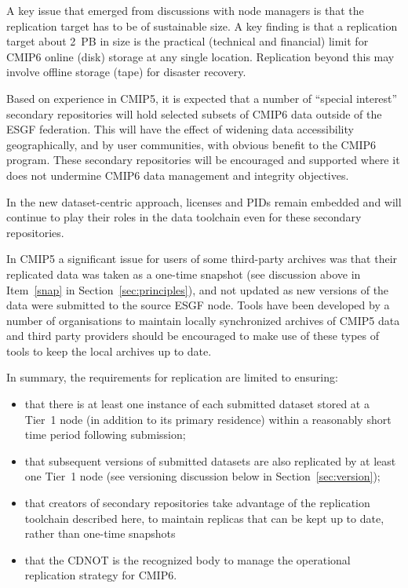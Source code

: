 \documentclass[gmd,manuscript]{copernicus}
\newcommand{\pllabel}[1]{\label{p-#1}\linelabel{l-#1}}
\begin{document}
A key issue that emerged from discussions with node managers is that
the replication target has to be of sustainable size. A key finding is
that a replication target about 2~PB in size is the practical
(technical and financial) limit for CMIP6 online (disk) storage at any
single location. Replication beyond this may involve offline storage
(tape) for disaster recovery.

Based on experience in CMIP5, it is expected that a number of
``special interest'' secondary repositories will hold selected subsets
of CMIP6 data outside of the ESGF federation. This will have the
effect of widening data accessibility geographically, and by user
communities, with obvious benefit to the CMIP6 program. These
secondary repositories will be encouraged and supported where it does
not undermine CMIP6 data management and integrity objectives.

\pllabel{RC1-62}
In the new dataset-centric approach, licenses and PIDs remain embedded
and will continue to play their roles in the data toolchain even for
these secondary repositories.

In CMIP5 a significant issue for users of some third-party archives
was that their replicated data was taken as a one-time snapshot (see
discussion above in Item~\ref{snap} in Section~\ref{sec:principles}),
and not updated as new versions of the data were submitted to the
source ESGF node. Tools have been developed by a number of
organisations to maintain locally synchronized archives of CMIP5 data
and third party providers should be encouraged to make use of these
types of tools to keep the local archives up to date.

In summary, the requirements for replication are limited to ensuring:

\begin{itemize}
\item that there is at least one instance of each submitted dataset
  stored at a Tier~1 node (in addition to its primary residence)
  within a reasonably short time period following submission;
\item that subsequent versions of submitted datasets are also
  replicated by at least one Tier~1 node (see versioning discussion
  below in Section~\ref{sec:version});
\item that creators of secondary repositories take advantage of the
  replication toolchain described here, to maintain replicas that can
  be kept up to date, rather than one-time snapshots
\item that the CDNOT is the recognized body to manage the operational
  replication strategy for CMIP6.
\end{itemize}
\end{document}
